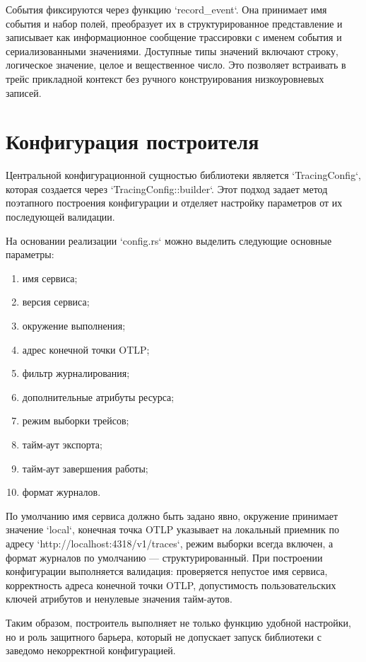 События фиксируются через функцию `record_event`. Она принимает имя события и набор
полей, преобразует их в структурированное представление и записывает как
информационное сообщение трассировки с именем события и сериализованными
значениями. Доступные типы значений включают строку, логическое значение, целое и
вещественное число. Это позволяет встраивать в трейс прикладной контекст без
ручного конструирования низкоуровневых записей.

\section{Конфигурация построителя}

Центральной конфигурационной сущностью библиотеки является `TracingConfig`, которая
создается через `TracingConfig::builder`. Этот подход задает метод поэтапного
построения конфигурации и отделяет настройку параметров от их последующей
валидации.

На основании реализации `config.rs` можно выделить следующие основные параметры:
\begin{enumerate}
    \item имя сервиса;
    \item версия сервиса;
    \item окружение выполнения;
    \item адрес конечной точки OTLP;
    \item фильтр журналирования;
    \item дополнительные атрибуты ресурса;
    \item режим выборки трейсов;
    \item тайм-аут экспорта;
    \item тайм-аут завершения работы;
    \item формат журналов.
\end{enumerate}

По умолчанию имя сервиса должно быть задано явно, окружение принимает значение
`local`, конечная точка OTLP указывает на локальный приемник по адресу
`http://localhost:4318/v1/traces`, режим выборки всегда включен, а формат журналов
по умолчанию --- структурированный. При построении конфигурации выполняется валидация:
проверяется непустое имя сервиса, корректность адреса конечной точки OTLP,
допустимость пользовательских ключей атрибутов и ненулевые значения тайм-аутов.

Таким образом, построитель выполняет не только функцию удобной настройки, но и
роль защитного барьера, который не допускает запуск библиотеки с заведомо
некорректной конфигурацией.

